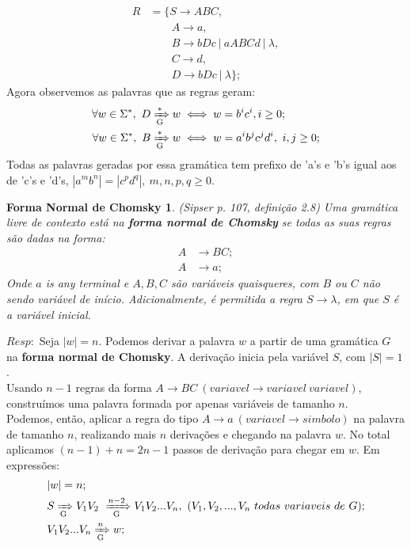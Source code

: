 \documentclass{homework}
\newtheorem*{theorem}{Forma Normal de Chomsky}
\begin{document}
\begin{itemize}
\begin{align*}
			R &= \{S \rightarrow ABC,\\
				&\qquad	A \rightarrow a, \\
				&\qquad	B \rightarrow bDc\ |\ aABCd\ |\ \lambda, \\
				&\qquad	C \rightarrow d, \\
				&\qquad	D \rightarrow bDc\ |\ \lambda\};
		\end{align*}
		Agora observemos as palavras que as regras geram:
		\begin{align*}
			\forall w \in \Sigma^*,\  D & \xRightarrow[\text{G}]{*} w \iff w = b^i c^i, i \geq 0;\\
			\forall w \in \Sigma^*,\  B & \xRightarrow[\text{G}]{*} w \iff w = a^i b^j c^j d^i,\ i,j \geq 0;
		\end{align*}
		Todas as palavras geradas por essa gramática tem prefixo de 'a's e 'b's igual aos de 'c's e 'd's, $|a^m b^n| = |c^p d^q|,\ m,n,p,q \geq 0$.
	\end{itemize}
\pagebreak

	\begin{theorem}
		(Sipser p. 107, definição 2.8) Uma gramática livre de contexto está na \textbf{forma normal de Chomsky} se todas as suas regras são dadas na forma:
		\begin{align*}
			A & \rightarrow BC; \\
			A & \rightarrow a;
		\end{align*}
		Onde $a$ is any terminal e $A,B,C$ são variáveis quaisqueres, com $B$ ou $C$ não sendo variável de início. Adicionalmente, é permitida a regra $S \rightarrow \lambda$, em que $S$ é a variável inicial.  
	\end{theorem}
	$Resp:$ Seja $|w| = n$. Podemos derivar a palavra $w$ a partir de uma gramática $G$ na \textbf{forma normal de Chomsky}. A derivação inicia pela variável $S$, com $|S| = 1$.\\
	Usando $n-1$ regras da forma $A \rightarrow BC\ (variavel \rightarrow variavel\ variavel)$, construímos uma palavra formada por apenas variáveis de tamanho $n$.\\
	Podemos, então, aplicar a regra do tipo $A \rightarrow a\ (variavel \rightarrow simbolo)$ na palavra de tamanho $n$, realizando mais $n$ derivações e chegando na palavra $w$. No total aplicamos $(n - 1) + n = 2n -1$ passos de derivação para chegar em $w$. Em expressões:
		\begin{align*}
			& |w| = n; \\			
			& S \xRightarrow[\text{G}]{} V_1V_2\ \xRightarrow[\text{G}]{n-2} V_1V_2...V_n,\  (V_1,V_2,...,V_n\ todas\ variaveis\ de\ G); \\
			& V_1V_2...V_n \xRightarrow[\text{G}]{n} w;
		\end{align*}
\end{document}
